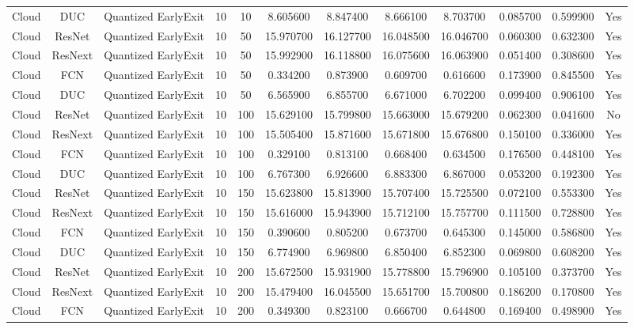 \begin{tabular}{|c||c||c||c||c||c||c||c||c||c||c||c|}
Cloud & DUC & Quantized EarlyExit & 10 & 10 & 8.605600 & 8.847400 & 8.666100 & 8.703700 & 0.085700 & 0.599900 & Yes \\
Cloud & ResNet & Quantized EarlyExit & 10 & 50 & 15.970700 & 16.127700 & 16.048500 & 16.046700 & 0.060300 & 0.632300 & Yes \\
Cloud & ResNext & Quantized EarlyExit & 10 & 50 & 15.992900 & 16.118800 & 16.075600 & 16.063900 & 0.051400 & 0.308600 & Yes \\
Cloud & FCN & Quantized EarlyExit & 10 & 50 & 0.334200 & 0.873900 & 0.609700 & 0.616600 & 0.173900 & 0.845500 & Yes \\
Cloud & DUC & Quantized EarlyExit & 10 & 50 & 6.565900 & 6.855700 & 6.671000 & 6.702200 & 0.099400 & 0.906100 & Yes \\
Cloud & ResNet & Quantized EarlyExit & 10 & 100 & 15.629100 & 15.799800 & 15.663000 & 15.679200 & 0.062300 & 0.041600 & No \\
Cloud & ResNext & Quantized EarlyExit & 10 & 100 & 15.505400 & 15.871600 & 15.671800 & 15.676800 & 0.150100 & 0.336000 & Yes \\
Cloud & FCN & Quantized EarlyExit & 10 & 100 & 0.329100 & 0.813100 & 0.668400 & 0.634500 & 0.176500 & 0.448100 & Yes \\
Cloud & DUC & Quantized EarlyExit & 10 & 100 & 6.767300 & 6.926600 & 6.883300 & 6.867000 & 0.053200 & 0.192300 & Yes \\
Cloud & ResNet & Quantized EarlyExit & 10 & 150 & 15.623800 & 15.813900 & 15.707400 & 15.725500 & 0.072100 & 0.553300 & Yes \\
Cloud & ResNext & Quantized EarlyExit & 10 & 150 & 15.616000 & 15.943900 & 15.712100 & 15.757700 & 0.111500 & 0.728800 & Yes \\
Cloud & FCN & Quantized EarlyExit & 10 & 150 & 0.390600 & 0.805200 & 0.673700 & 0.645300 & 0.145000 & 0.586800 & Yes \\
Cloud & DUC & Quantized EarlyExit & 10 & 150 & 6.774900 & 6.969800 & 6.850400 & 6.852300 & 0.069800 & 0.608200 & Yes \\
Cloud & ResNet & Quantized EarlyExit & 10 & 200 & 15.672500 & 15.931900 & 15.778800 & 15.796900 & 0.105100 & 0.373700 & Yes \\
Cloud & ResNext & Quantized EarlyExit & 10 & 200 & 15.479400 & 16.045500 & 15.651700 & 15.700800 & 0.186200 & 0.170800 & Yes \\
Cloud & FCN & Quantized EarlyExit & 10 & 200 & 0.349300 & 0.823100 & 0.666700 & 0.644800 & 0.169400 & 0.498900 & Yes \\

\end{tabular}
